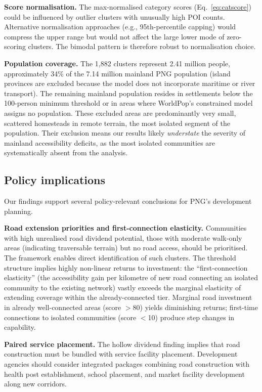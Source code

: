 \documentclass[review,3p,authoryear]{elsarticle}
\begin{document}
\textbf{Score normalisation.} The max-normalised category scores (Eq.~\ref{eq:catscore}) could be influenced by outlier clusters with unusually high POI counts. Alternative normalisation approaches (e.g., 95th-percentile capping) would compress the upper range but would not affect the large lower mode of zero-scoring clusters. The bimodal pattern is therefore robust to normalisation choice.

\textbf{Population coverage.} The 1,882 clusters represent 2.41 million people, approximately 34\% of the 7.14 million mainland PNG population (island provinces are excluded because the model does not incorporate maritime or river transport). The remaining mainland population resides in settlements below the 100-person minimum threshold or in areas where WorldPop's constrained model assigns no population. These excluded areas are predominantly very small, scattered homesteads in remote terrain, the most isolated segment of the population. Their exclusion means our results likely \textit{understate} the severity of mainland accessibility deficits, as the most isolated communities are systematically absent from the analysis.

\subsection{Policy implications}

Our findings support several policy-relevant conclusions for PNG's development planning.

\textbf{Road extension priorities and first-connection elasticity.} Communities with high unrealised road dividend potential, those with moderate walk-only areas (indicating traversable terrain) but no road access, should be prioritised. The framework enables direct identification of such clusters. The threshold structure implies highly non-linear returns to investment: the ``first-connection elasticity'' (the accessibility gain per kilometre of new road connecting an isolated community to the existing network) vastly exceeds the marginal elasticity of extending coverage within the already-connected tier. Marginal road investment in already well-connected areas (score $>$80) yields diminishing returns; first-time connections to isolated communities (score $<$10) produce step changes in capability.

\textbf{Paired service placement.} The hollow dividend finding implies that road construction must be bundled with service facility placement. Development agencies should consider integrated packages combining road construction with health post establishment, school placement, and market facility development along new corridors.
\end{document}
